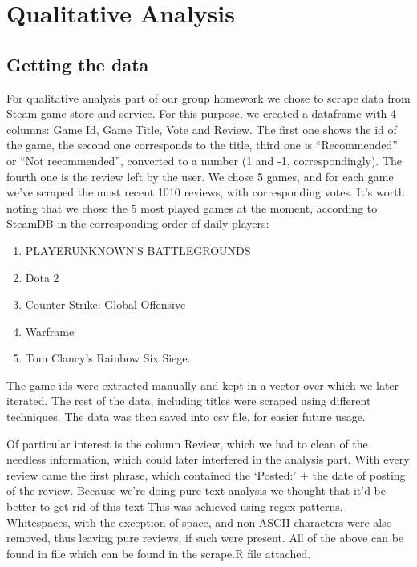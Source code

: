 \documentclass[]{article}
\providecommand{\tightlist}{%
  \setlength{\itemsep}{0pt}\setlength{\parskip}{0pt}}
\begin{document}
\section{Qualitative Analysis}\label{qualitative-analysis}

\subsection{Getting the data}\label{getting-the-data-1}

For qualitative analysis part of our group homework we chose to scrape
data from Steam game store and service. For this purpose, we created a
dataframe with 4 columns: Game Id, Game Title, Vote and Review. The
first one shows the id of the game, the second one corresponds to the
title, third one is ``Recommended'' or ``Not recommended'', converted to
a number (1 and -1, correspondingly). The fourth one is the review left
by the user. We chose 5 games, and for each game we've scraped the most
recent 1010 reviews, with corresponding votes. It's worth noting that we
chose the 5 most played games at the moment, according to
\href{http://steamdb.info}{SteamDB} in the corresponding order of daily
players:

\begin{enumerate}
\def\labelenumi{\arabic{enumi}.}
\tightlist
\item
  PLAYERUNKNOWN'S BATTLEGROUNDS
\item
  Dota 2
\item
  Counter-Strike: Global Offensive
\item
  Warframe
\item
  Tom Clancy's Rainbow Six Siege.
\end{enumerate}

The game ids were extracted manually and kept in a vector over which we
later iterated. The rest of the data, including titles were scraped
using different techniques. The data was then saved into csv file, for
easier future usage.

Of particular interest is the column Review, which we had to clean of
the needless information, which could later interfered in the analysis
part. With every review came the first phrase, which contained the
`Posted:' + the date of posting of the review. Because we're doing pure
text analysis we thought that it'd be better to get rid of this text
This was achieved using regex patterns. Whitespaces, with the exception
of space, and non-ASCII characters were also removed, thus leaving pure
reviews, if such were present. All of the above can be found in file
which can be found in the scrape.R file attached.
\end{document}
